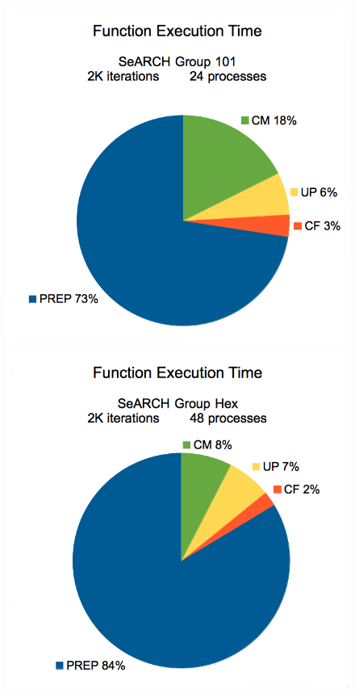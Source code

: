 \begin{figure}[!t]
	\begin{center}
		\includegraphics[width=\columnwidth]{report.may/images/load24101.png}
		\includegraphics[width=\columnwidth]{report.may/images/load48hex.png}

\end{center}
\end{figure}
